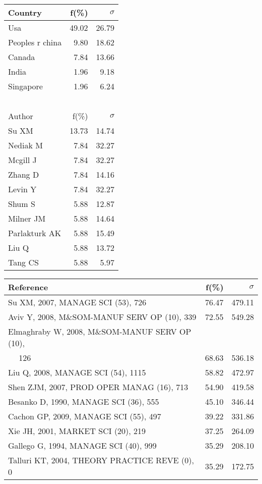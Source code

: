 \documentclass[a4paper,11pt]{report}
\begin{document}
\begin{landscape}
\begin{table}[!ht]
{\begin{tabular}{|l r r|}
\hline
\hline
Country & f(\%) & $\sigma$\\
\hline
Usa & 49.02 & 26.79\\
Peoples r china & 9.80 & 18.62\\
Canada & 7.84 & 13.66\\
India & 1.96 & 9.18\\
Singapore & 1.96 & 6.24\\
 &  & \\
 &  & \\
 &  & \\
 &  & \\
 &  & \\
\hline
\hline
Author & f(\%) & $\sigma$\\
\hline
Su XM & 13.73 & 14.74\\
Nediak M & 7.84 & 32.27\\
Mcgill J & 7.84 & 32.27\\
Zhang D & 7.84 & 14.16\\
Levin Y & 7.84 & 32.27\\
Shum S & 5.88 & 12.87\\
Milner JM & 5.88 & 14.64\\
Parlakturk AK & 5.88 & 15.49\\
Liu Q & 5.88 & 13.72\\
Tang CS & 5.88 & 5.97\\
\hline
\end{tabular}
}
{\scriptsize\begin{tabular}{|l r r|}
\hline
Reference & f(\%) & $\sigma$\\
\hline
Su XM, 2007, MANAGE SCI (53), 726 & 76.47 & 479.11\\
Aviv Y, 2008, M\&SOM-MANUF SERV OP (10), 339 & 72.55 & 549.28\\
Elmaghraby W, 2008, M\&SOM-MANUF SERV OP (10), &  & \\
$\quad$ 126 & 68.63 & 536.18\\
Liu Q, 2008, MANAGE SCI (54), 1115 & 58.82 & 472.97\\
Shen ZJM, 2007, PROD OPER MANAG (16), 713 & 54.90 & 419.58\\
Besanko D, 1990, MANAGE SCI (36), 555 & 45.10 & 346.44\\
Cachon GP, 2009, MANAGE SCI (55), 497 & 39.22 & 331.86\\
Xie JH, 2001, MARKET SCI (20), 219 & 37.25 & 264.09\\
Gallego G, 1994, MANAGE SCI (40), 999 & 35.29 & 208.10\\
Talluri KT, 2004, THEORY PRACTICE REVE (0), 0 & 35.29 & 172.75\\

\end{tabular}}
\end{table}
\end{landscape}
\end{document}
